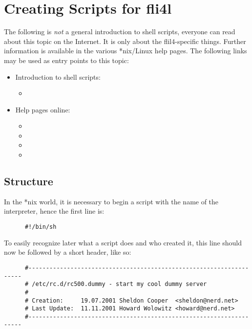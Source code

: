 
\section{Creating Scripts for fli4l}


The following is \emph{not} a general introduction to shell scripts,
everyone can read about this topic on the Internet. It is only about the flil4-specific
things. Further information is available in the various *nix/Linux help pages.
The following links may be used as entry points to this topic:
\begin{itemize}
\item Introduction to shell scripts:
  \begin{itemize}
  \item {}
  \end{itemize}
 \item
   Help pages online:
   \begin{itemize}
   \item {}
   \item {}
   \item {}
   \item {}
   \end{itemize}
\end{itemize}

\subsection{Structure}

    In the *nix world, it is necessary to begin a script with the name of the interpreter,
    hence the first line is:
\begin{example}
\begin{verbatim}
      #!/bin/sh
\end{verbatim}
\end{example}

    To easily recognize later what a script does and who created it,
    this line should now be followed by a short header, like so:

\begin{example}
\begin{verbatim}
      #--------------------------------------------------------------------
      # /etc/rc.d/rc500.dummy - start my cool dummy server
      #
      # Creation:     19.07.2001 Sheldon Cooper  <sheldon@nerd.net>
      # Last Update:  11.11.2001 Howard Wolowitz <howard@nerd.net>
      #--------------------------------------------------------------------
\end{verbatim}
\end{example}

